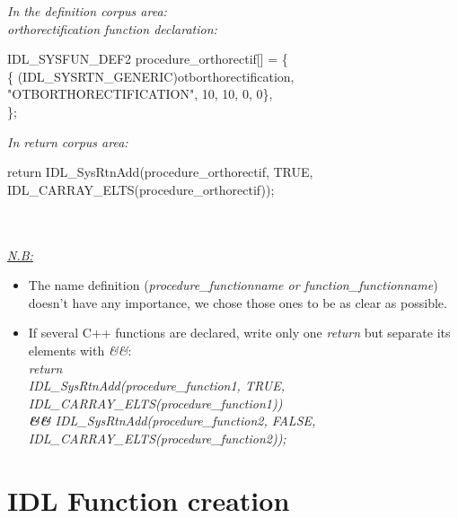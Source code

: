 \indent \emph{In the definition corpus area:}\\
\indent \emph{orthorectification function declaration:}\\
\begin{scriptsize}
\indent IDL\_SYSFUN\_DEF2 procedure\_orthorectif[] = \{\\
\indent \{ (IDL\_SYSRTN\_GENERIC)otborthorectification, "OTBORTHORECTIFICATION", 10, 10, 0, 0\},\\
\indent \};\\
\end{scriptsize}
\indent \emph{In return corpus area:} \\
\begin{scriptsize}
\indent return IDL\_SysRtnAdd(procedure\_orthorectif, TRUE,\\  
\indent IDL\_CARRAY\_ELTS(procedure\_orthorectif)); \\
\end{scriptsize}
\\
\\
\emph{\underline{N.B:}}
 \begin{itemize}
\item The name definition (\emph{procedure\_functionname or function\_functionname}) doesn't have any importance, we chose those ones to be as clear as possible.
\item If several C++ functions are declared, write only one \emph{return} but separate its elements with \emph{\&\&}:\\
      \emph{return\\
            IDL\_SysRtnAdd(procedure\_function1, TRUE, IDL\_CARRAY\_ELTS(procedure\_function1))\\
            \textbf{\&\&} IDL\_SysRtnAdd(procedure\_function2, FALSE, IDL\_CARRAY\_ELTS(procedure\_function2));} \\
\end{itemize}


\section{IDL Function creation}
